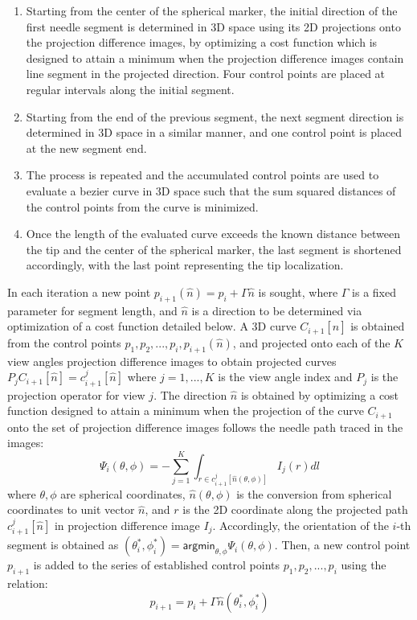 \documentclass[letterpaper, 11 pt, conference]{ieeeconf} %
\begin{document}
\begin{enumerate}
 \item Starting from the center of the spherical marker, the initial direction of the first needle segment is determined in 3D space using its 2D projections onto the projection difference images, by optimizing a cost function which is designed to attain a minimum when the projection difference images contain line segment in the projected direction. Four control points are placed at regular intervals along the initial segment.
 \item Starting from the end of the previous segment, the next segment direction is determined in 3D space in a similar manner, and one control point is placed at the new segment end.
 \item The process is repeated and the accumulated control points are used to evaluate a bezier curve in 3D space such that the sum squared distances of the control points from the curve is minimized.
 \item Once the length of the evaluated curve exceeds the known distance between the tip and the center of the spherical marker, the last segment is shortened accordingly, with the last point representing the tip localization.
\end{enumerate}

In each iteration a new point $p_{i+1}(\hat{n}) = p_i + \Gamma \hat{n}$ is sought, where $\Gamma$ is a fixed parameter for segment length, and $\hat{n}$ is a direction to be determined via optimization of a cost function detailed below.
A 3D curve $C_{i+1}[\hat{n}]$ is obtained from the control points $p_1, p_2, ..., p_i, p_{i+1}(\hat{n})$, and projected onto each of the $K$ view angles projection difference images to obtain projected curves $P_j C_{i+1}[\hat{n}] = c_{i+1}^j[\hat{n}]$ where $j=1,...,K$ is the view angle index and $P_j$ is the projection operator for view $j$.
The direction $\hat{n}$ is obtained by optimizing a cost function designed to attain a minimum when the projection of the curve $C_{i+1}$ onto the set of projection difference images follows the needle path traced in the images:
\[ \Psi_i(\theta, \phi) = -\sum_{j=1}^K{\int_{r \in c_{i+1}^j[\hat{n}(\theta, \phi)]} {I_j(r)dl}} \]
where $ \theta, \phi$ are spherical coordinates, $ \hat{n}(\theta, \phi) $ is the conversion from spherical coordinates to unit vector $ \hat{n} $, and $r$ is the 2D coordinate along the projected path $c_{i+1}^j[\hat{n}]$ in projection difference image $I_j$. 
Accordingly, the orientation of the $i$-th segment is obtained as $(\theta_i^*, \phi_i^*) = \textsf{argmin}_{\theta, \phi} \Psi_i ( \theta, \phi)$. Then, a new control point $p_{i+1}$ is added to the series of established control points $p_1, p_2, ..., p_i$ using the relation:
$$ p_{i+1} = p_i + \Gamma \hat{n}(\theta_i^*, \phi_i^*) $$
\end{document}
